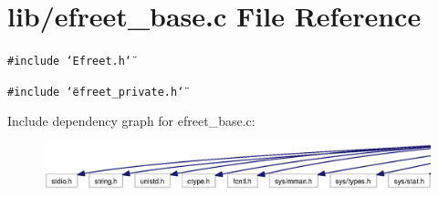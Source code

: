 \section{lib/efreet\_\-base.c File Reference}
\label{efreet__base_8c}


{\tt \#include \char`\"{}Efreet.h\char`\"{}}\par
{\tt \#include \char`\"{}efreet\_\-private.h\char`\"{}}\par


Include dependency graph for efreet\_\-base.c:\nopagebreak
\begin{figure}[H]
\begin{center}
\leavevmode
\includegraphics[width=420pt]{efreet__base_8c__incl}
\end{center}
\end{figure}
